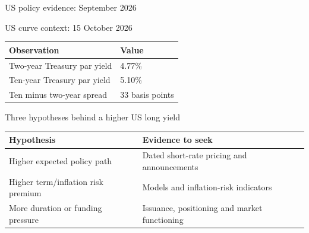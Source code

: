 \documentclass[12pt,aspectratio=169]{beamer}
\begin{document}

\begin{frame}{US policy evidence: September 2026}
\end{frame}


\begin{frame}{US curve context: 15 October 2026}
\begin{center}\begin{tabular}{@{}ll@{}}\toprule \textbf{Observation} & \textbf{Value}\\\midrule Two-year Treasury par yield & 4.77\%\\[2mm]
Ten-year Treasury par yield & 5.10\%\\[2mm]
Ten minus two-year spread & 33 basis points\\\bottomrule\end{tabular}\end{center}
\end{frame}


\begin{frame}{Three hypotheses behind a higher US long yield}
\begin{center}\begin{tabular}{@{}p{}p{}@{}}\toprule \textbf{Hypothesis} & \textbf{Evidence to seek}\\\midrule Higher expected policy path & Dated short-rate pricing and announcements\\[2mm]
Higher term/inflation risk premium & Models and inflation-risk indicators\\[2mm]
More duration or funding pressure & Issuance, positioning and market functioning\\\bottomrule\end{tabular}\end{center}
\end{frame}

\end{document}
